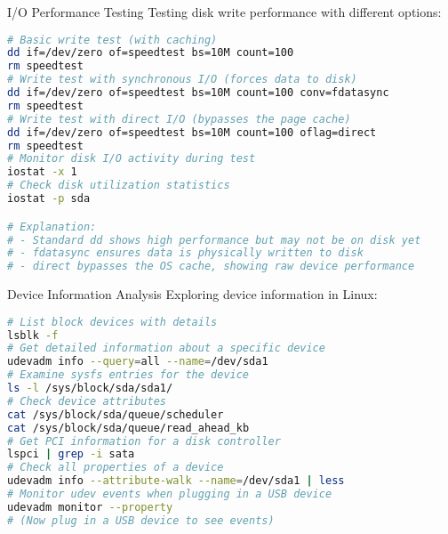 \begin{example2}{I/O Performance Testing}
    Testing disk write performance with different options:
    
\begin{lstlisting}[language=bash, style=basesmol]
# Basic write test (with caching)
dd if=/dev/zero of=speedtest bs=10M count=100
rm speedtest
# Write test with synchronous I/O (forces data to disk)
dd if=/dev/zero of=speedtest bs=10M count=100 conv=fdatasync
rm speedtest
# Write test with direct I/O (bypasses the page cache)
dd if=/dev/zero of=speedtest bs=10M count=100 oflag=direct
rm speedtest
# Monitor disk I/O activity during test
iostat -x 1
# Check disk utilization statistics
iostat -p sda

# Explanation:
# - Standard dd shows high performance but may not be on disk yet
# - fdatasync ensures data is physically written to disk
# - direct bypasses the OS cache, showing raw device performance
\end{lstlisting}
\end{example2}

\begin{example2}{Device Information Analysis}
    Exploring device information in Linux:
    
\begin{lstlisting}[language=bash, style=basesmol]
# List block devices with details
lsblk -f
# Get detailed information about a specific device
udevadm info --query=all --name=/dev/sda1
# Examine sysfs entries for the device
ls -l /sys/block/sda/sda1/
# Check device attributes
cat /sys/block/sda/queue/scheduler
cat /sys/block/sda/queue/read_ahead_kb
# Get PCI information for a disk controller
lspci | grep -i sata
# Check all properties of a device
udevadm info --attribute-walk --name=/dev/sda1 | less
# Monitor udev events when plugging in a USB device
udevadm monitor --property
# (Now plug in a USB device to see events)
\end{lstlisting}
\end{example2}